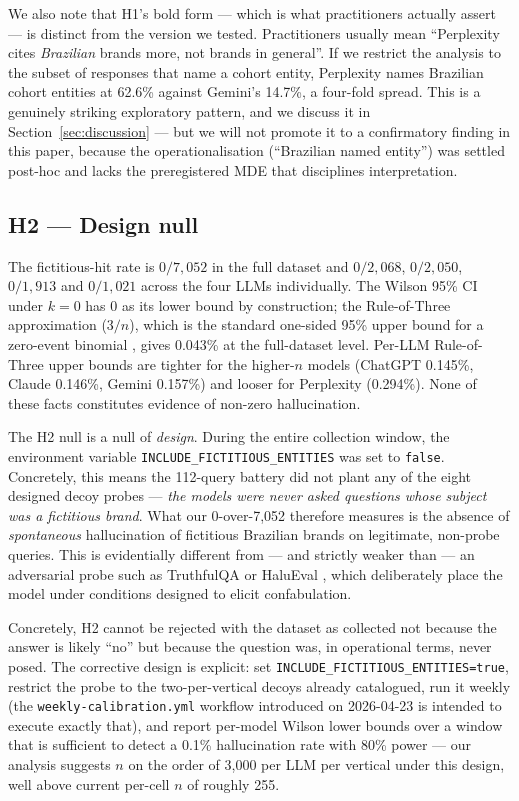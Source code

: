\documentclass[preprint,12pt,authoryear]{elsarticle}
\begin{document}
We also note that H1's bold form --- which is what practitioners actually assert --- is distinct from the version we tested. Practitioners usually mean ``Perplexity cites \emph{Brazilian} brands more, not brands in general''. If we restrict the analysis to the subset of responses that name a cohort entity, Perplexity names Brazilian cohort entities at 62.6\% against Gemini's 14.7\%, a four-fold spread. This is a genuinely striking exploratory pattern, and we discuss it in Section~\ref{sec:discussion} --- but we will not promote it to a confirmatory finding in this paper, because the operationalisation (``Brazilian named entity'') was settled post-hoc and lacks the preregistered MDE that disciplines interpretation.

\subsection{H2 --- Design null}
\sloppypar
The fictitious-hit rate is $0/7{,}052$ in the full dataset and $0/2{,}068$, $0/2{,}050$, $0/1{,}913$ and $0/1{,}021$ across the four LLMs individually. The Wilson 95\% CI under $k=0$ has 0 as its lower bound by construction; the Rule-of-Three approximation ($3/n$), which is the standard one-sided 95\% upper bound for a zero-event binomial \citep{Hanley1983, Eypasch1995}, gives 0.043\% at the full-dataset level. Per-LLM Rule-of-Three upper bounds are tighter for the higher-$n$ models (ChatGPT 0.145\%, Claude 0.146\%, Gemini 0.157\%) and looser for Perplexity (0.294\%). None of these facts constitutes evidence of non-zero hallucination.

The H2 null is a null of \emph{design}. During the entire collection window, the environment variable \texttt{INCLUDE\_FICTITIOUS\_ENTITIES} was set to \texttt{false}. Concretely, this means the 112-query battery did not plant any of the eight designed decoy probes --- \emph{the models were never asked questions whose subject was a fictitious brand}. What our 0-over-7{,}052 therefore measures is the absence of \emph{spontaneous} hallucination of fictitious Brazilian brands on legitimate, non-probe queries. This is evidentially different from --- and strictly weaker than --- an adversarial probe such as TruthfulQA \citep{Liu2023} or HaluEval \citep{Zhang2023}, which deliberately place the model under conditions designed to elicit confabulation.

Concretely, H2 cannot be rejected with the dataset as collected not because the answer is likely ``no'' but because the question was, in operational terms, never posed. The corrective design is explicit: set \texttt{INCLUDE\_FICTITIOUS\_ENTITIES=true}, restrict the probe to the two-per-vertical decoys already catalogued, run it weekly (the \texttt{weekly-calibration.yml} workflow introduced on 2026-04-23 is intended to execute exactly that), and report per-model Wilson lower bounds over a window that is sufficient to detect a 0.1\% hallucination rate with 80\% power --- our analysis suggests $n$ on the order of 3{,}000 per LLM per vertical under this design, well above current per-cell $n$ of roughly 255.
\end{document}
